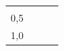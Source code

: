 {\begin{tabular}[t]{|l|l|l|l|}
         &
    
    
         &
    
    
     \tabularnewline\cline{1-1}\cline{2-2}\cline{3-3}\cline{4-4}
    
    
        0,5 &
    
    
         &
    
    
         &
    
    
     \tabularnewline\cline{1-1}\cline{2-2}\cline{3-3}\cline{4-4}
    
    
        1,0 &
    
    
         &
    

\end{tabular}}

